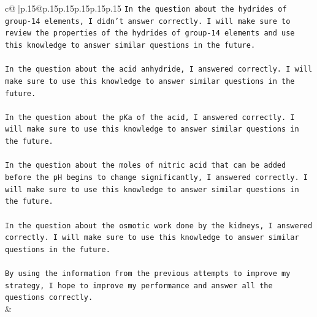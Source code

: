 \documentclass{article}
\begin{document}
{\begin{supertabular}{c@{$\;$}|p{.15\linewidth}@{}p{.15\linewidth}p{.15\linewidth}p{.15\linewidth}p{.15\linewidth}p{.15\linewidth}}
{{{\texttt{In the question about the hydrides of group{-}14 elements, I didn't answer correctly. I will make sure to review the properties of the hydrides of group{-}14 elements and use this knowledge to answer similar questions in the future.} \\
\\ 
\texttt{In the question about the acid anhydride, I answered correctly. I will make sure to use this knowledge to answer similar questions in the future.} \\
\\ 
\texttt{In the question about the pKa of the acid, I answered correctly. I will make sure to use this knowledge to answer similar questions in the future.} \\
\\ 
\texttt{In the question about the moles of nitric acid that can be added before the pH begins to change significantly, I answered correctly. I will make sure to use this knowledge to answer similar questions in the future.} \\
\\ 
\texttt{In the question about the osmotic work done by the kidneys, I answered correctly. I will make sure to use this knowledge to answer similar questions in the future.} \\
\\ 
\texttt{By using the information from the previous attempts to improve my strategy, I hope to improve my performance and answer all the questions correctly.} \\
            }
        }
    }
    & \\ \\

\end{supertabular}
}
\end{document}
